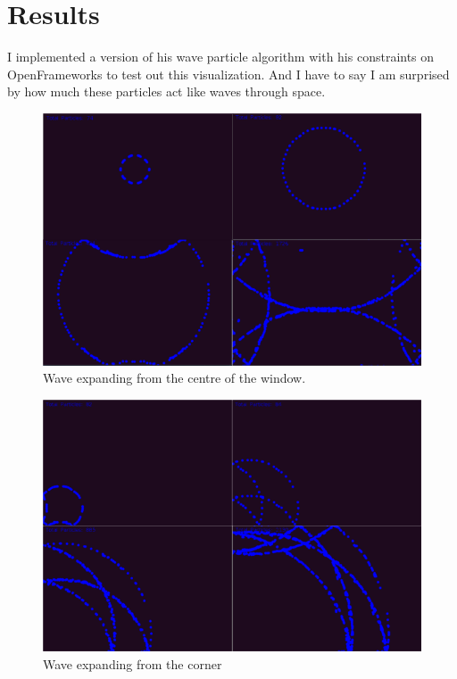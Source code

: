 \documentclass[11pt]{article}
\begin{document}
\section{Results}
I implemented a version of his wave particle algorithm with his constraints on OpenFrameworks to test out this visualization. And I have to say I am surprised by how much these particles act like waves through space. 

    \begin{figure}[H]
        \centering
        \includegraphics[width=\textwidth]{center.png}
        \caption{Wave expanding from the centre of the window.}
    \end{figure}
    \begin{figure}[H]
        \centering
        \includegraphics[width=\textwidth]{corner.png}
        \caption{Wave expanding from the corner}
    \end{figure}
    
\end{document}
